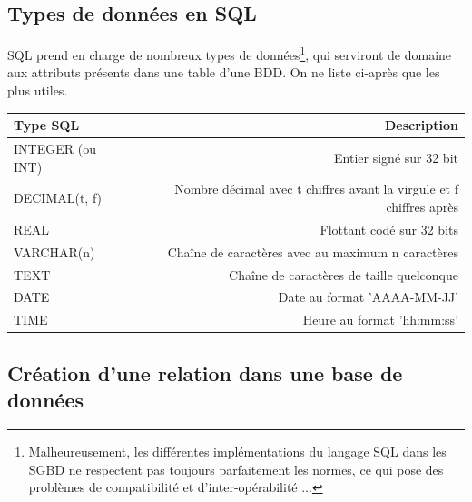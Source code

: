 \documentclass[11pt,a4paper,french,twoside]{PMCours}
\begin{document}
\subsection{Types de données en SQL}

SQL prend en charge de nombreux types de données\footnote{Malheureusement, les différentes implémentations du langage SQL dans les SGBD ne respectent pas toujours parfaitement les normes, ce qui pose des problèmes de compatibilité et d'inter-opérabilité ...}, qui serviront de domaine aux attributs présents dans une table d'une BDD. On ne liste ci-après que les plus utiles.

\begin{center}
\begin{tabular}[c]{|l|r|} \hline
Type SQL & Description\\ \hline
INTEGER (ou INT) & Entier signé sur 32 bit\\ \hline
DECIMAL(t, f) & Nombre décimal avec t chiffres avant la virgule et f chiffres après\\ \hline
REAL & Flottant codé sur 32 bits\\ \hline
VARCHAR(n) & Chaîne de caractères avec au maximum n caractères\\ \hline
TEXT & Chaîne de caractères de taille quelconque\\ \hline
DATE & Date au format 'AAAA-MM-JJ'\\ \hline
TIME & Heure au format 'hh:mm:ss'\\  \hline
\end{tabular}
\end{center}


\subsection{Création d'une relation dans une base de données}
\end{document}
